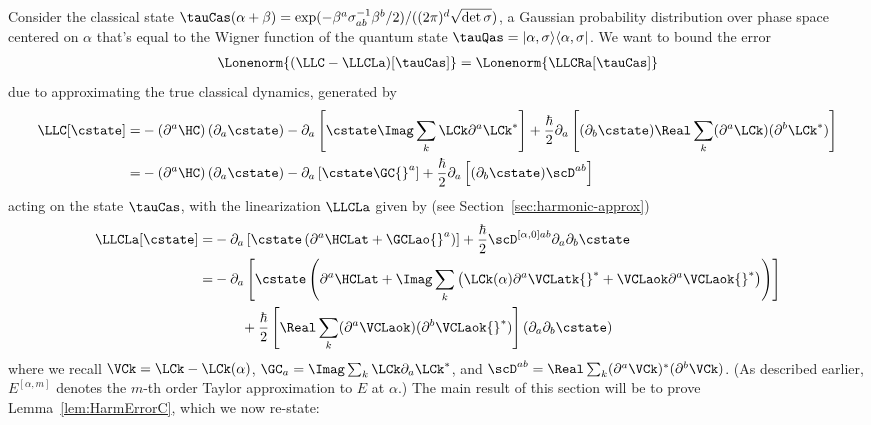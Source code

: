 \documentclass{article}
\numberwithin{equation}{section}
\begin{document}
Consider the classical state $\tauCas(\alpha+\beta) = \exp(-\beta^a\sigma^{-1}_{ab}\beta^b/2)/((2 \pi)^d\sqrt{\det\sigma})$, a Gaussian probability distribution over phase space centered on $\alpha$ that's equal to the Wigner function of the quantum state $\tauQas = |\alpha,\sigma\rangle\langle \alpha,\sigma|$.  We want to bound the error 
\begin{align}
	\Lonenorm{(\LLC-\LLCLa)[\tauCas]} =  \Lonenorm{\LLCRa[\tauCas]}
\end{align}
due to approximating the true classical dynamics, generated by
\begin{align}\label{eq:classical-fokker-planck-exact}
	\LLC[\cstate]=& - \left(\partial^a \HC \right)(\partial_a \cstate)  - \partial_a\left[\cstate  \Imag \sum_k \LCk \partial^a \LCk^* \right]   + \frac{\hbar}{2} \partial_a \left[ ( \partial_b \cstate) \Real \sum_k(\partial^a \LCk)(\partial^b \LCk^*)\right]\\
	=& - \left(\partial^a \HC \right)(\partial_a \cstate)  - \partial_a\left[\cstate  \GC{}^a \right]   + \frac{\hbar}{2} \partial_a \left[ ( \partial_b \cstate) \scD^{ab}\right]
\end{align}
acting on the state $\tauCas$, with the linearization $\LLCLa$ given by (see Section~\ref{sec:harmonic-approx})
\begin{align}\label{eq:classical-fokker-planck-harmonic-2}
	\LLCLa [\cstate]
    =&   -\partial_a\left[\cstate \left(\partial^a \HCLat+ \GCLao{}^{a} \right)\right] + \frac{\hbar}{2}  \scD^{[\alpha,0]ab}\partial_a \partial_b \cstate\\
    =&  -\partial_a\left[\cstate  \left(\partial^a \HCLat + \Imag \sum_k \left(\LCk (\alpha) \partial^a  \VCLatk{}^* + \VCLaok \partial^a  \VCLaok{}^* \right)\right)\right]   \\
	&\qquad + \frac{\hbar}{2}  \left[ \Real \sum_k(\partial^a \VCLaok)(\partial^b  \VCLaok{}^*)\right](\partial_a \partial_b \cstate)
\end{align}
where we recall $\VCk = \LCk-\LCk(\alpha)$, $\GC_a = \Imag\sum_k \LCk \partial_a \LCk^*$, and $\scD^{ab} = \Real\sum_k (\partial^a \VCk)^* (\partial^b\VCk)$. 
(As described earlier, $E^{[\alpha,m]}$ denotes the $m$-th order Taylor approximation to $E$ at $\alpha$.)
The main result of this section will be to prove Lemma~\ref{lem:HarmErrorC}, which we now re-state:

\lemHarmErrorC*
\end{document}
